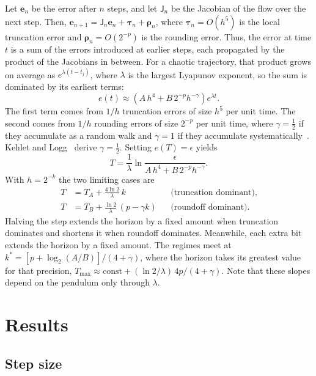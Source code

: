 \documentclass[12pt,a4paper]{article}
\begin{document}
Let $\bm e_n$ be the error after $n$ steps, and let $\mathsf J_n$ be the
Jacobian of the flow over the next step. Then,
$\bm e_{n+1}=\mathsf J_n\bm e_n+\bm\tau_n+\bm\rho_n$, where $\bm\tau_n=O(h^5)$
is the local truncation error and $\bm\rho_n=O(2^{-p})$ is the rounding error.
Thus, the error at time $t$ is a sum of the errors introduced at earlier steps,
each propagated by the product of the Jacobians in between. For a chaotic
trajectory, that product grows on average as $e^{\lambda(t-t_j)}$, where
$\lambda$ is the largest Lyapunov exponent, so the sum is dominated by its
earliest terms:
\begin{equation}
e(t)\approx\left(A\,h^{4}+B\,2^{-p}h^{-\gamma}\right)e^{\lambda t}.
\label{eq:error}
\end{equation}
The first term comes from $1/h$ truncation errors of size $h^5$ per unit time. The
second comes from $1/h$ rounding errors of size $2^{-p}$ per unit time, where
$\gamma=\tfrac12$ if they accumulate as a random walk and $\gamma=1$ if they
accumulate systematically~\cite{hairer2008}. Kehlet and
Logg~\cite{kehlet2017} derive $\gamma=\tfrac12$. Setting $e(T)=\epsilon$ yields
\begin{equation}
T=\frac1\lambda\ln\frac{\epsilon}{A\,h^{4}+B\,2^{-p}h^{-\gamma}} .
\label{eq:horizon}
\end{equation}
With $h=2^{-k}$ the two limiting cases are
\begin{align}
T&=T_A+\frac{4\ln2}{\lambda}\,k &&\text{(truncation dominant)},\label{eq:Tk}\\
T&=T_B+\frac{\ln2}{\lambda}\,(p-\gamma k) &&\text{(roundoff dominant)}.\label{eq:Tp}
\end{align}
Halving the step extends the horizon by a fixed amount when truncation dominates
and shortens it when roundoff dominates. Meanwhile, each extra bit extends the
horizon by a fixed amount. The regimes meet at
$k^\ast=[p+\log_2(A/B)]/(4+\gamma)$, where the horizon takes its greatest value
for that precision,
$T_{\max}\approx\mathrm{const}+(\ln2/\lambda)\,4p/(4+\gamma)$. Note that these
slopes depend on the pendulum only through $\lambda$.

\section{Results}

\subsection{Step size}
\end{document}
